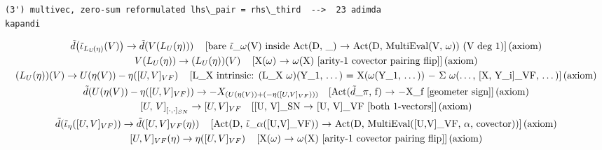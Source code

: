 \documentclass[11pt]{article}
\newcommand{\prompt}[4]{
        {\ttfamily\llap{{\color{#2}[#3]:\hspace{3pt}#4}}\vspace{-\baselineskip}}
    }
\begin{document}
    \begin{Verbatim}[commandchars=\\\{\}]
(3') multivec, zero-sum reformulated lhs\_pair = rhs\_third  -->  23 adimda
kapandi
    \end{Verbatim}
 
            
\prompt{Out}{outcolor}{8}{}
    
    {\allowdisplaybreaks\scriptsize
\begin{gather*}
\tilde{d}\!\left(\tilde{\iota}_{L_U\!\left(\eta\right)}\!\left(V\right)\right) \to \tilde{d}\!\left(V\!\left(L_U\!\left(\eta\right)\right)\right) \quad \text{[bare \ensuremath{\tilde{\ensuremath{\iota}}}\_\ensuremath{\omega}(V) inside Act(D, \_) \ensuremath{\to} Act(D, MultiEval(V, \ensuremath{\omega}))  (V deg 1)]\,(axiom)} \\
V\!\left(L_U\!\left(\eta\right)\right) \to \left(L_U\!\left(\eta\right)\right)\!\left(V\right) \quad \text{[X(\ensuremath{\omega}) \ensuremath{\to} \ensuremath{\omega}(X)  [arity-1 covector pairing flip]]\,(axiom)} \\
\left(L_U\!\left(\eta\right)\right)\!\left(V\right) \to U\!\left(\eta\!\left(V\right)\right) - \eta\!\left([U,V]_{VF}\right) \quad \text{[L\_X intrinsic: (L\_X \ensuremath{\omega})(Y\_1, \ensuremath{\dots}) = X(\ensuremath{\omega}(Y\_1, \ensuremath{\dots})) \ensuremath{-} \ensuremath{\Sigma} \ensuremath{\omega}(\ensuremath{\dots}, [X, Y\_i]\_VF, \ensuremath{\dots})]\,(axiom)} \\
\tilde{d}\!\left(U\!\left(\eta\!\left(V\right)\right) - \eta\!\left([U,V]_{VF}\right)\right) \to -X_{(U(\eta(V)) + (-\eta([U,V]_{VF})))} \quad \text{[Act(\ensuremath{\tilde{d}}\_\ensuremath{\pi}, f) \ensuremath{\to} \ensuremath{-}X\_f  [geometer sign]]\,(axiom)} \\
\left[U,\, V\right]_{[\cdot,\cdot]_{SN}} \to [U,V]_{VF} \quad \text{[[U, V]\_SN \ensuremath{\to} [U, V]\_VF  [both 1-vectors]]\,(axiom)} \\
\tilde{d}\!\left(\tilde{\iota}_{\eta}\!\left([U,V]_{VF}\right)\right) \to \tilde{d}\!\left([U,V]_{VF}\!\left(\eta\right)\right) \quad \text{[Act(D, \ensuremath{\tilde{\ensuremath{\iota}}}\_\ensuremath{\alpha}([U,V]\_VF)) \ensuremath{\to} Act(D, MultiEval([U,V]\_VF, \ensuremath{\alpha}, covector))]\,(axiom)} \\
[U,V]_{VF}\!\left(\eta\right) \to \eta\!\left([U,V]_{VF}\right) \quad \text{[X(\ensuremath{\omega}) \ensuremath{\to} \ensuremath{\omega}(X)  [arity-1 covector pairing flip]]\,(axiom)} \\

\end{gather*}}
\end{document}
